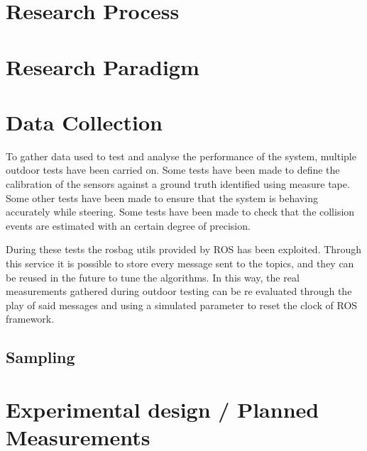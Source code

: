 \section{Research Process}
\label{sec:researchProcess}


\section{Research Paradigm}
\label{sec:researchParadigm}

\section{Data Collection}
\label{sec:dataCollection}
To gather data used to test and analyse the performance of the system, multiple outdoor tests have been carried on.
Some tests have been made to define the calibration of the sensors against a ground truth identified using measure tape.
Some other tests have been made to ensure that the system is behaving accurately while steering.
Some tests have been made to check that the collision events are estimated with an certain degree of precision.

During these tests the rosbag utils provided by ROS has been exploited. Through this service it is possible to store every message sent to the topics, and they can be reused in the future to tune the algorithms.
In this way, the real measurements gathered during outdoor testing can be re evaluated through the play of said messages and using a simulated parameter to reset the clock of ROS framework.



\subsection{Sampling}


\section{Experimental design / Planned Measurements}
\label{sec:experimentalDesign}

